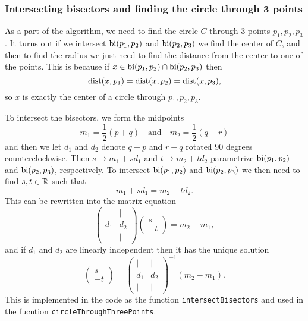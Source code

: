 \newpage
\subsubsection*{Intersecting bisectors and finding the circle through 3 points}
As a part of the algorithm, we need to find the circle $C$ through 3 points $p_1, p_2, p_3$. It turns out if we intersect $\operatorname{bi}(p_1, p_2)$ and $\operatorname{bi}(p_2, p_3)$ we find the center of $C$, and then to find the radius we just need to find the distance from the center to one of the points. This is because if $x \in \operatorname{bi}(p_1, p_2) \cap \operatorname{bi}(p_2, p_3)$ then
\[
    \operatorname{dist}(x, p_1) = \operatorname{dist}(x, p_2) = \operatorname{dist}(x, p_3),
\]
so $x$ is exactly the center of a circle through $p_1, p_2, p_3$.

To intersect the bisectors, we form the midpoints
\[
    m_1 = \frac{1}{2}(p + q) \quad \text{and} \quad m_2 = \frac{1}{2}(q + r)
\]
and then we let $d_1$ and $d_2$ denote $q - p$ and $r - q$ rotated 90 degrees counterclockwise. Then $s \mapsto m_1 + s d_1$ and $t \mapsto m_2 + t d_2$ parametrize $\operatorname{bi}(p_1, p_2)$ and $\operatorname{bi}(p_2, p_3)$, respectively. To intersect $\operatorname{bi}(p_1, p_2)$ and $\operatorname{bi}(p_2, p_3)$ we then need to find $s, t \in \mathbb{R}$ such that
\[
    m_1 + s d_1 = m_2 + t d_2.
\]
This can be rewritten into the matrix equation
\[
    \begin{pmatrix}
        \mid & \mid \\
        d_1 & d_2 \\
        \mid & \mid
    \end{pmatrix} \begin{pmatrix}
        s \\
        -t
    \end{pmatrix}
    =
    m_2 - m_1,
\]
and if $d_1$ and $d_2$ are linearly independent then it has the unique solution
\[
    \begin{pmatrix}
        s \\
        -t
    \end{pmatrix}
    =
    \begin{pmatrix}
        \mid & \mid \\
        d_1 & d_2 \\
        \mid & \mid
    \end{pmatrix}^{-1} (m_2 - m_1).
\]
This is implemented in the code as the function \texttt{intersectBisectors} and used in the fucntion \texttt{circleThroughThreePoints}.

